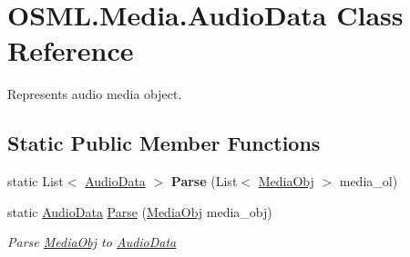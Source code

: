 \hypertarget{classOSML_1_1Media_1_1AudioData}{}\section{O\+S\+M\+L.\+Media.\+Audio\+Data Class Reference}
\label{classOSML_1_1Media_1_1AudioData}


Represents audio media object.  


\subsection*{Static Public Member Functions}
\begin{DoxyCompactItemize}
\item 
\mbox{\label{classOSML_1_1Media_1_1AudioData_a27efab67c7debf5cae385f278d2316b7}} 
static List$<$ \mbox{\hyperlink{classOSML_1_1Media_1_1AudioData}{Audio\+Data}} $>$ {\bfseries Parse} (List$<$ \mbox{\hyperlink{classOSML_1_1Media_1_1MediaObj}{Media\+Obj}} $>$ media\+\_\+ol)
\item 
static \mbox{\hyperlink{classOSML_1_1Media_1_1AudioData}{Audio\+Data}} \mbox{\hyperlink{classOSML_1_1Media_1_1AudioData_a540e7ad195c5545350ae7260dc410fef}{Parse}} (\mbox{\hyperlink{classOSML_1_1Media_1_1MediaObj}{Media\+Obj}} media\+\_\+obj)
\begin{DoxyCompactList}\small\item\em Parse \mbox{\hyperlink{classOSML_1_1Media_1_1MediaObj}{Media\+Obj}} to \mbox{\hyperlink{classOSML_1_1Media_1_1AudioData}{Audio\+Data}} \end{DoxyCompactList}\end{DoxyCompactItemize}
